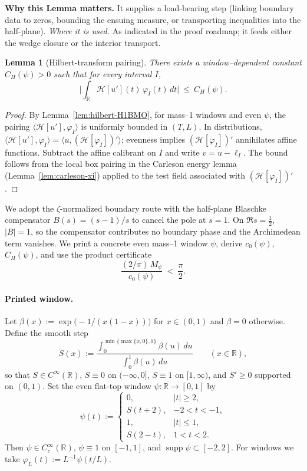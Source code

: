 \documentclass[11pt]{article}
\newtheorem{lemma}{Lemma}[section]
\theoremstyle{definition}
\theoremstyle{remark}
\newcommand{\R}{\mathbb{R}}
\begin{document}
\vspace{1.0cm}
\noindent\textbf{Why this Lemma matters.} It supplies a load-bearing step (linking boundary data to zeros, bounding the ensuing measure, or transporting inequalities into the half-plane).
\noindent\textit{Where it is used.} As indicated in the proof roadmap; it feeds either the wedge closure or the interior transport.
\begin{lemma}[Hilbert-transform pairing]
\label{lem:hilbert}
There exists a window–dependent constant \(C_H(\psi)>0\) such that for every interval \(I\),
\[ \Big|\int_{\R} \mathcal H[u'](t)\,\varphi_I(t)\,dt\Big|\ \le\ C_H(\psi).\]
\end{lemma}
\begin{proof}
By Lemma~\ref{lem:hilbert-H1BMO}, for mass–1 windows and even \(\psi\), the pairing \(\langle \mathcal H[u'],\varphi_I\rangle\) is uniformly bounded in \((T,L)\). In distributions, \(\langle \mathcal H[u'],\varphi_I\rangle=\langle u,(\mathcal H[\varphi_I])'\rangle\); evenness implies \((\mathcal H[\varphi_I])'\) annihilates affine functions. Subtract the affine calibrant on \(I\) and write \(v=u-\ell_I\). The bound follows from the local box pairing in the Carleson energy lemma (Lemma~\ref{lem:carleson-xi}) applied to the test field associated with \((\mathcal H[\varphi_I])'\).
\end{proof}
We adopt the \(\zeta\)-normalized boundary route with the half-plane Blaschke compensator \(B(s)=(s-1)/s\) to cancel the pole at \(s=1\). On \(\Re s=\tfrac12\), \(|B|=1\), so the compensator contributes no boundary phase and the Archimedean term vanishes. We print a concrete even mass--1 window \(\psi\), derive \(c_0(\psi)\), \(C_H(\psi)\), and use the product certificate
\[
  \frac{(2/\pi)\,M_\psi}{c_0(\psi)}\ <\ \frac{\pi}{2}.
  \]




  

\vspace{1.0cm}
\paragraph{Printed window.}
Let \(\beta(x):=\exp\!\big(-1/(x(1-x))\big)\) for \(x\in(0,1)\) and \(\beta=0\) otherwise. Define the smooth step
\[
  S(x):=\frac{\int_0^{\min\{\max\{x,0\},1\}} \beta(u)\,du}{\int_0^{1} \beta(u)\,du}\qquad (x\in\R),
\]
so that \(S\in C^\infty(\R)\), \(S\equiv 0\) on \(({-}\infty,0]\), \(S\equiv1\) on \([1,\infty)\), and \(S'\ge 0\) supported on \((0,1)\). Set the even flat-top window \(\psi:\R\to[0,1]\) by
\[
  \psi(t):=\begin{cases}
    0,& |t|\ge 2,\\
    S(t+2),& -2<t<-1,\\
    1,& |t|\le 1,\\
    S(2-t),& 1<t<2.
  \end{cases}
\]
Then \(\psi\in C_c^\infty(\R)\), \(\psi\equiv 1\) on \([-1,1]\), and \(\operatorname{supp}\psi\subset[-2,2]\). For windows we take \(\varphi_L(t):=L^{-1}\psi(t/L)\).
\end{document}
